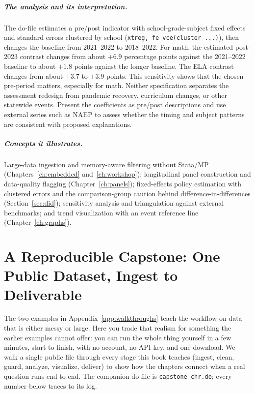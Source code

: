 \paragraph{The analysis and its interpretation.} The do-file estimates a pre/post indicator with school-grade-subject fixed effects and standard errors clustered by school (\texttt{xtreg, fe vce(cluster ...)}), then changes the baseline from 2021--2022 to 2018--2022. For math, the estimated post-2023 contrast changes from about $+6.9$ percentage points against the 2021--2022 baseline to about $+1.8$ points against the longer baseline. The ELA contrast changes from about $+3.7$ to $+3.9$ points. This sensitivity shows that the chosen pre-period matters, especially for math. Neither specification separates the assessment redesign from pandemic recovery, curriculum changes, or other statewide events. Present the coefficients as pre/post descriptions and use external series such as NAEP to assess whether the timing and subject patterns are consistent with proposed explanations.

\paragraph{Concepts it illustrates.} Large-data ingestion and memory-aware filtering without Stata/MP (Chapters~\ref{ch:embedded} and~\ref{ch:workshop}); longitudinal panel construction and data-quality flagging (Chapter~\ref{ch:panels}); fixed-effects policy estimation with clustered errors and the comparison-group caution behind difference-in-differences (Section~\ref{sec:did}); sensitivity analysis and triangulation against external benchmarks; and trend visualization with an event reference line (Chapter~\ref{ch:graphs}).

\chapter{A Reproducible Capstone: One Public Dataset, Ingest to Deliverable}\label{app:capstone}

The two examples in Appendix~\ref{app:walkthroughs} teach the workflow on data that is either messy or large. Here you trade that realism for something the earlier examples cannot offer: you can run the whole thing yourself in a few minutes, start to finish, with no account, no API key, and one download. We walk a single public file through every stage this book teaches (ingest, clean, guard, analyze, visualize, deliver) to show how the chapters connect when a real question runs end to end. The companion do-file is \texttt{capstone\_chr.do}; every number below traces to its log.

